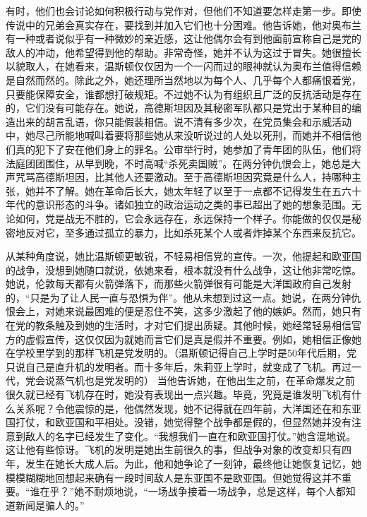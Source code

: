 有时，他们也会讨论如何积极行动与党作对，但他们不知道要怎样走第一步。即使传说中的兄弟会真实存在，要找到并加入它们也十分困难。他告诉她，他对奥布兰有一种或者说似乎有一种微妙的亲近感，这让他偶尔会有到他面前宣称自己是党的敌人的冲动，他希望得到他的帮助。非常奇怪，她并不认为这过于冒失。她很擅长以貌取人，在她看来，温斯顿仅仅因为一个一闪而过的眼神就认为奥布兰值得信赖是自然而然的。除此之外，她还理所当然地以为每个人、几乎每个人都痛恨着党，只要能保障安全，谁都想打破规矩。不过她不认为有组织且广泛的反抗活动是存在的，它们没有可能存在。她说，高德斯坦因及其秘密军队都只是党出于某种目的编造出来的胡言乱语，你只能假装相信。说不清有多少次，在党员集会和示威活动中，她尽己所能地喊叫着要将那些她从来没听说过的人处以死刑，而她并不相信他们真的犯下了安在他们身上的罪名。公审举行时，她参加了青年团的队伍，他们将法庭团团围住，从早到晚，不时高喊``杀死卖国贼''。在两分钟仇恨会上，她总是大声咒骂高德斯坦因，比其他人还要激动。至于高德斯坦因究竟是什么人，持哪种主张，她并不了解。她在革命后长大，她太年轻了以至于一点都不记得发生在五六十年代的意识形态的斗争。诸如独立的政治运动之类的事已超出了她的想象范围。无论如何，党是战无不胜的，它会永远存在，永远保持一个样子。你能做的仅仅是秘密地反对它，至多通过孤立的暴力，比如杀死某个人或者炸掉某个东西来反抗它。

从某种角度说，她比温斯顿更敏锐，不轻易相信党的宣传。一次，他提起和欧亚国的战争，没想到她随口就说，依她来看，根本就没有什么战争，这让他非常吃惊。她说，伦敦每天都有火箭弹落下，而那些火箭弹很有可能是大洋国政府自己发射的，``只是为了让人民一直与恐惧为伴''。他从未想到过这一点。她说，在两分钟仇恨会上，对她来说最困难的便是忍住不笑，这多少激起了他的嫉妒。然而，她只有在党的教条触及到她的生活时，才对它们提出质疑。其他时候，她经常轻易相信官方的虚假宣传，这仅仅因为就她而言它们是真是假并不重要。例如，她相信正像她在学校里学到的那样飞机是党发明的。（温斯顿记得自己上学时是50年代后期，党只说自己是直升机的发明者。而十多年后，朱莉亚上学时，就变成了飞机。再过一代，党会说蒸气机也是党发明的）
当他告诉她，在他出生之前，在革命爆发之前很久就已经有飞机存在时，她没有表现出一点兴趣。毕竟，究竟是谁发明飞机有什么关系呢？令他震惊的是，他偶然发现，她不记得就在四年前，大洋国还在和东亚国打仗，和欧亚国和平相处。没错，她觉得整个战争都是假的，但显然她并没有注意到敌人的名字已经发生了变化。``我想我们一直在和欧亚国打仗。''她含混地说。这让他有些惊讶。飞机的发明是她出生前很久的事，但战争对象的改变却只有四年，发生在她长大成人后。为此，他和她争论了一刻钟，最终他让她恢复记忆，她模模糊糊地回想起来确有一段时间敌人是东亚国不是欧亚国。但她觉得这并不重要。``谁在乎？''她不耐烦地说，``一场战争接着一场战争，总是这样，每个人都知道新闻是骗人的。''

